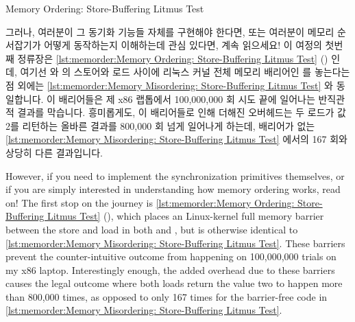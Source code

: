 \begin{listing}[tbp]

\caption{Memory Ordering: Store-Buffering Litmus Test}
\label{lst:memorder:Memory Ordering: Store-Buffering Litmus Test}
\end{listing}

그러나, 여러분이 그 동기화 기능들 자체를 구현해야 한다면, 또는 여러분이 메모리
순서잡기가 어떻게 동작하는지 이해하는데 관심 있다면, 계속 읽으세요!
이 여정의 첫번째 정류장은
\cref{lst:memorder:Memory Ordering: Store-Buffering Litmus Test}
() 인데, 여기선  와  의
스토어와 로드 사이에 리눅스 커널 전체 메모리 배리어인  를 놓는다는
점 외에는
\cref{lst:memorder:Memory Misordering: Store-Buffering Litmus Test} 와
동일합니다.
이 배리어들은 제 x86 랩톱에서 100,000,000 회 시도 끝에 일어나는 반직관적 결과를
막습니다.
흥미롭게도, 이 배리어들로 인해 더해진 오버헤드는 두 로드가 값 2를 리턴하는
올바른 결과를 800,000 회 넘게 일어나게 하는데, 배리어가 없는
\cref{lst:memorder:Memory Misordering: Store-Buffering Litmus Test} 에서의 167
회와 상당히 다른 결과입니다.

\iffalse

However, if you need to implement the synchronization primitives
themselves, or if you are simply interested in understanding how memory
ordering works, read on!
The first stop on the journey is
\cref{lst:memorder:Memory Ordering: Store-Buffering Litmus Test}
(),
which places an  Linux-kernel full memory barrier between
the store and load in both  and , but is otherwise
identical to
\cref{lst:memorder:Memory Misordering: Store-Buffering Litmus Test}.
These barriers prevent the counter-intuitive outcome from happening
on 100,000,000 trials on my x86 laptop.
Interestingly enough, the added overhead due to these barriers causes the
legal outcome where both loads return the value two to happen more
than 800,000 times, as opposed to only 167 times for the
barrier-free code in
\cref{lst:memorder:Memory Misordering: Store-Buffering Litmus Test}.

